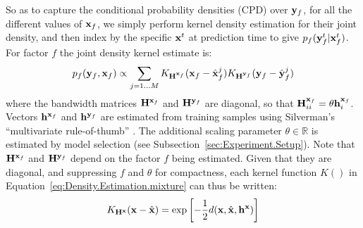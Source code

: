 So as to capture the conditional probability densities (CPD) over $\mathbf{y}_f$, for all the different values of $\mathbf{x}_f$, we simply perform kernel density estimation for their joint density, and then  index by the specific $\mathbf{x}^t$ at prediction time to give $p_f(\mathbf{y}_f^t|\mathbf{x}_f^t)$. For factor $f$ the joint density kernel estimate is:
\begin{equation}
p_f(\mathbf{y}_f,\mathbf{x}_f) \propto \mathop{\sum}_{j=1 \ldots M}
K_{\mathbf{H}^{\mathbf{x}_f}}(\mathbf{x}_f - \hat{\mathbf{x}}_f^j)
K_{\mathbf{H}^{\mathbf{y}_f}}(\mathbf{y}_f - \hat{\mathbf{y}}_f^j)
\label{eq:Density.Estimation.mixture}
\end{equation}
\noindent where the bandwidth matrices  $\mathbf{H}^{\mathbf{x}_f} $ and $\mathbf{H}^{\mathbf{y}_f} $ are diagonal, so that $\mathbf{H}^{\mathbf{x}_f}_{ii}  = \theta \mathbf{h}^{\mathbf{x}_f}_i$. Vectors $\mathbf{h}^{\mathbf{x}_f}$ and $\mathbf{h}^{\mathbf{y}_f}$  are estimated from training samples using Silverman's ``multivariate rule-of-thumb'' \citep{scott2004multi-dimensional}. The additional scaling parameter $\theta \in \mathbb{R}$ is estimated by model selection (see Subsection~\ref{sec:Experiment.Setup}). Note that $\mathbf{H}^{\mathbf{x}_f}$ and $\mathbf{H}^{\mathbf{y}_f}$ depend on the factor $f$ being estimated. Given that they are diagonal, and suppressing $f$ and $\theta$ for compactness, each kernel function $K()$ in Equation~\eqref{eq:Density.Estimation.mixture} can thus be written:
\begin{equation}
K_{\mathbf{H}^{\mathbf{x}}}(\mathbf{x} - \hat{\mathbf{x}}) = \exp \left[-\frac{1}{2}d(\mathbf{x}, \hat{\mathbf{x}}, \mathbf{h^{x}}) \right]
\label{eq:Density.Estimation.kernel}
\end{equation}

